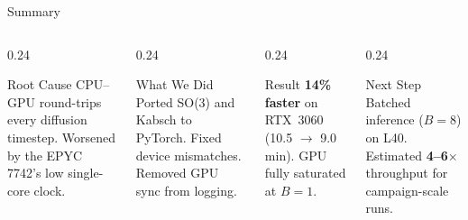\documentclass[aspectratio=169, 10pt]{beamer}
\begin{document}
\begin{frame}{Summary}
\vspace{0.3cm}
\begin{columns}[T]
\begin{column}{0.24\textwidth}
  \begin{block}{Root Cause}
    \small CPU--GPU round-trips every diffusion timestep. Worsened by the EPYC 7742's low single-core clock.
  \end{block}
\end{column}
\begin{column}{0.24\textwidth}
  \begin{block}{What We Did}
    \small Ported SO(3) and Kabsch to PyTorch. Fixed device mismatches. Removed GPU sync from logging.
  \end{block}
\end{column}
\begin{column}{0.24\textwidth}
  \begin{block}{Result}
    \small \textbf{14\% faster} on RTX~3060 (10.5 $\to$ 9.0 min). GPU fully saturated at $B{=}1$.
  \end{block}
\end{column}
\begin{column}{0.24\textwidth}
  \begin{block}{Next Step}
    \small Batched inference ($B{=}8$) on L40. Estimated \textbf{4--6$\times$} throughput for campaign-scale runs.
  \end{block}
\end{column}
\end{columns}
\end{frame}

\begin{frame}[plain]
\end{frame}
\end{document}
